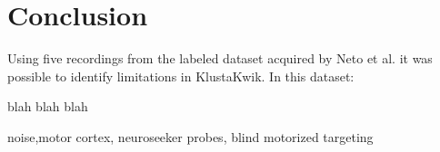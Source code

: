 \section{Conclusion}
\label{sec:chap2-conclusion}

Using five recordings from the labeled dataset acquired by Neto et al. it was possible to identify limitations in KlustaKwik. In this dataset:

blah blah blah

noise,motor cortex, neuroseeker probes, blind motorized targeting

